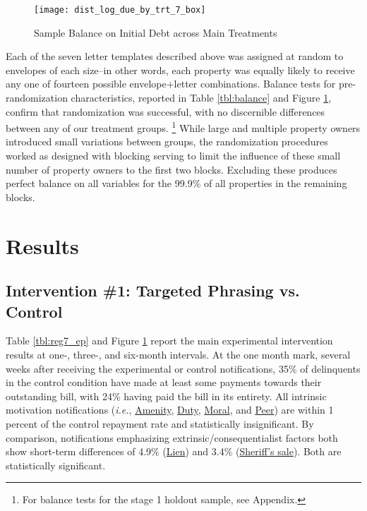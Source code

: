 \documentclass[12pt,titlepage]{article}
\begin{document}
\begin{figure}[htpb]
\begin{center}
\caption{Sample Balance on Initial Debt across Main Treatments}
\label{fig:box_bal}
\bigskip
\texttt{[image: dist\_log\_due\_by\_trt\_7\_box]}
\end{center}
\end{figure}

Each of the seven letter templates described above was assigned at random 
to envelopes of each size--in other words, each property was equally 
likely to receive any one of fourteen possible envelope+letter combinations. 
Balance tests for pre-randomization characteristics, 
reported in Table \ref{tbl:balance} and Figure \ref{fig:box_bal}, 
confirm that randomization was successful, 
with no discernible differences between any of our treatment groups.
\footnote{For balance tests for the stage 1 holdout sample, see Appendix.}
While large and multiple property owners introduced small variations 
between groups, the randomization procedures worked as designed with 
blocking serving to limit the influence of these small number of property 
owners to the first two blocks. Excluding these produces perfect balance 
on all variables for the 99.9\% of all properties in the remaining blocks.

\section{Results}

\subsection{Intervention \#1: Targeted Phrasing vs. Control}

Table \ref{tbl:reg7_ep} and Figure \ref{fig:box_bal} report the main 
experimental intervention results at one-, three-, and six-month 
intervals. At the one month mark, several weeks after receiving the 
experimental or control notifications, 35\% of delinquents in the 
control condition have made at least some payments towards their 
outstanding bill, with 24\% having paid the bill in its entirety. All 
intrinsic motivation notifications (\textit{i.e.}, \hyperlink{amenities}{Amenity}, 
\hyperlink{duty}{Duty}, \hyperlink{moral}{Moral}, and \hyperlink{peer}{Peer}) 
are within 1 percent of the control repayment rate and 
statistically insignificant. By comparison, notifications emphasizing 
extrinsic/consequentialist factors both show short-term differences of 
4.9\% (\hyperlink{lien}{Lien}) and 3.4\% (\hyperlink{sheriff}{Sheriff's sale}). 
Both are statistically significant. 
\end{document}
